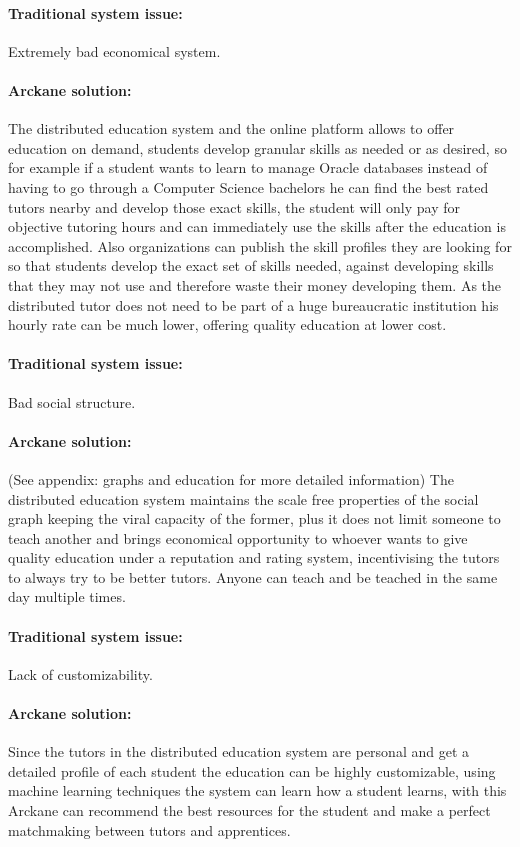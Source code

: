 \paragraph{Traditional system issue:} Extremely bad economical system.
\paragraph{Arckane solution:} The distributed education system and the online platform allows to offer education on demand, students develop granular skills as needed or as desired, so for example if a student wants to learn to manage Oracle databases instead of having to go through a Computer Science bachelors he can find the best rated tutors nearby and develop those exact skills, the student will only pay for objective tutoring hours and can immediately use the skills after the education is accomplished. Also organizations can publish the skill profiles they are looking for so that students develop the exact set of skills needed, against developing skills that they may not use and therefore waste their money developing them. As the distributed tutor does not need to be part of a huge bureaucratic institution his hourly rate can be much lower, offering quality education at lower cost.

\paragraph{Traditional system issue:} Bad social structure.
\paragraph{Arckane solution:} (See appendix: graphs and education for more detailed information) The distributed education system maintains the scale free properties of the social graph keeping the viral capacity of the former, plus it does not limit someone to teach another and brings economical opportunity to whoever wants to give quality education under a reputation and rating system, incentivising the tutors to always try to be better tutors. Anyone can teach and be teached in the same day multiple times.

\paragraph{Traditional system issue:} Lack of customizability.
\paragraph{Arckane solution:} Since the tutors in the distributed education system are personal and get a detailed profile of each student the education can be highly customizable, using machine learning techniques the system can learn how a student learns, with this Arckane can recommend the best resources for the student and make a perfect matchmaking between tutors and apprentices.

